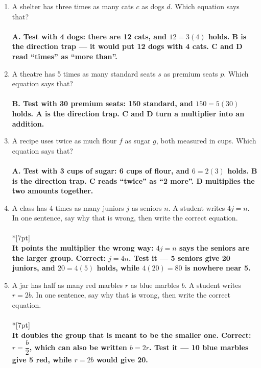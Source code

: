 \documentclass[11pt,a4paper]{article}
\newcommand{\ans}[1]{\ {\color{keyred}\bfseries #1}}
\newcommand{\ans}[1]{}
\begin{document}
\begin{enumerate}[leftmargin=20pt,itemsep=9pt]
\item A shelter has three times as many cats $c$ as dogs $d$. Which equation says that?\\
  \ans{\\ A. Test with 4 dogs: there are 12 cats, and $12=3(4)$ holds. B is the
  direction trap --- it would put 12 dogs with 4 cats. C and D read ``times'' as
  ``more than''.}

\item A theatre has 5 times as many standard seats $s$ as premium seats $p$. Which
  equation says that?\\
  \ans{\\ B. Test with 30 premium seats: 150 standard, and $150=5(30)$ holds. A is the
  direction trap. C and D turn a multiplier into an addition.}

\item A recipe uses twice as much flour $f$ as sugar $g$, both measured in cups. Which
  equation says that?\\
  \ans{\\ A. Test with 3 cups of sugar: 6 cups of flour, and $6=2(3)$ holds. B is the
  direction trap. C reads ``twice'' as ``2 more''. D multiplies the two amounts
  together.}

\item A class has 4 times as many juniors $j$ as seniors $n$. A student writes $4j=n$.
  In one sentence, say why that is wrong, then write the correct equation.\\
  \underline{\hspace{\linewidth}}\\*[7pt]
  \underline{\hspace{\linewidth}}
  \ans{\\ It points the multiplier the wrong way: $4j=n$ says the seniors are the larger
  group. Correct: $j=4n$. Test it --- 5 seniors give 20 juniors, and $20=4(5)$ holds,
  while $4(20)=80$ is nowhere near 5.}

\item A jar has half as many red marbles $r$ as blue marbles $b$. A student writes
  $r=2b$. In one sentence, say why that is wrong, then write the correct equation.\\
  \underline{\hspace{\linewidth}}\\*[7pt]
  \underline{\hspace{\linewidth}}
  \ans{\\ It doubles the group that is meant to be the smaller one. Correct:
  $r=\dfrac{b}{2}$, which can also be written $b=2r$. Test it --- 10 blue marbles give
  5 red, while $r=2b$ would give 20.}
\end{enumerate}
\end{document}
